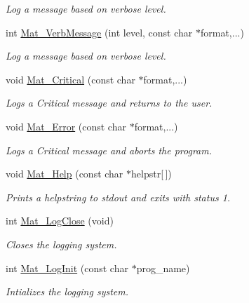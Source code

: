 \begin{DoxyCompactItemize}
\begin{DoxyCompactList}\small\item\em \-Log a message based on verbose level. \end{DoxyCompactList}\item 
int \hyperlink{group__mat__util_ga64a176ea7e27e38d4242a24f3e3bad24}{\-Mat\-\_\-\-Verb\-Message} (int level, const char $\ast$format,...)
\begin{DoxyCompactList}\small\item\em \-Log a message based on verbose level. \end{DoxyCompactList}\item 
void \hyperlink{group__mat__util_gaf51f2bfbb5580f575e4dd79757e2b80c}{\-Mat\-\_\-\-Critical} (const char $\ast$format,...)
\begin{DoxyCompactList}\small\item\em \-Logs a \-Critical message and returns to the user. \end{DoxyCompactList}\item 
void \hyperlink{group__mat__util_ga058b1cb9a4ca36712857d2b3c4de7ffc}{\-Mat\-\_\-\-Error} (const char $\ast$format,...)
\begin{DoxyCompactList}\small\item\em \-Logs a \-Critical message and aborts the program. \end{DoxyCompactList}\item 
void \hyperlink{group__mat__util_gaa4039c185e807ed2e9682b66fe2ea331}{\-Mat\-\_\-\-Help} (const char $\ast$helpstr\mbox{[}$\,$\mbox{]})
\begin{DoxyCompactList}\small\item\em \-Prints a helpstring to stdout and exits with status 1. \end{DoxyCompactList}\item 
int \hyperlink{group__mat__util_ga333d15dbd2e7a691621a2af8fc7adc3d}{\-Mat\-\_\-\-Log\-Close} (void)
\begin{DoxyCompactList}\small\item\em \-Closes the logging system. \end{DoxyCompactList}\item 
int \hyperlink{group__mat__util_ga0d30e03216ceaab7c0a4ff878b26f89f}{\-Mat\-\_\-\-Log\-Init} (const char $\ast$prog\-\_\-name)
\begin{DoxyCompactList}\small\item\em \-Intializes the logging system. \end{DoxyCompactList}\item 

\end{DoxyCompactItemize}
